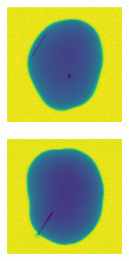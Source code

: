 \documentclass[11pt]{article}
\begin{document}
\begin{figure}[!h]
\begin{subfigure}[b]{0.22\textwidth}
         \caption{}
         \label{fig:metal_29}
     \end{subfigure}
     \hfill
     \begin{subfigure}[b]{0.22\textwidth}
         \centering
         \includegraphics[width=\textwidth]{figurer/potato_dataset/metal/metal_30.jpg}
         \caption{}
         \label{fig:metal_30}
     \end{subfigure}
     \hfill
     \begin{subfigure}[b]{0.22\textwidth}
         \centering
         \includegraphics[width=\textwidth]{figurer/potato_dataset/metal/metal_31.jpg}

\end{subfigure}
\end{figure}
\end{document}
